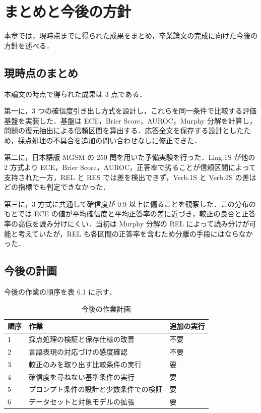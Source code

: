 \chapter{まとめと今後の方針}

本章では，現時点までに得られた成果をまとめ，卒業論文の完成に向けた今後の方針を述べる．

\section{現時点のまとめ}

本論文の時点で得られた成果は 3 点である．

第一に，3 つの確信度引き出し方式を設計し，これらを同一条件で比較する評価基盤を実装した．基盤は ECE，Brier Score，AUROC，Murphy 分解を計算し，問題の復元抽出による信頼区間を算出する．応答全文を保存する設計としたため，採点処理の不具合を追加の問い合わせなしに修正できた．

第二に，日本語版 MGSM の 250 問を用いた予備実験を行った．Ling.1S が他の 2 方式より ECE，Brier Score，AUROC，正答率で劣ることが信頼区間によって支持された一方，REL と RES では差を検出できず，Verb.1S と Verb.2S の差はどの指標でも判定できなかった．

第三に，3 方式に共通して確信度が 0.9 以上に偏ることを観察した．この分布のもとでは ECE の値が平均確信度と平均正答率の差に近づき，較正の良否と正答率の高低を読み分けにくい．当初は Murphy 分解の REL によって読み分けが可能と考えていたが，REL も各区間の正答率を含むため分離の手段にはならなかった．

\section{今後の計画}

今後の作業の順序を表 6.1 に示す．

\begin{table}[htbp]
\centering
\small
\caption{今後の作業計画}
\label{tab:6.1}
\begin{tabularx}{\linewidth}{|l|X|l|}
\hline
順序 & 作業 & 追加の実行 \\
\hline
1 & 採点処理の検証と保存仕様の改善 & 不要 \\
2 & 言語表現の対応づけの感度確認 & 不要 \\
3 & 較正のみを取り出す比較条件の実行 & 要 \\
4 & 確信度を尋ねない基準条件の実行 & 要 \\
5 & プロンプト条件の設計と少数条件での検証 & 要 \\
6 & データセットと対象モデルの拡張 & 要 \\
\hline
\end{tabularx}
\end{table}

